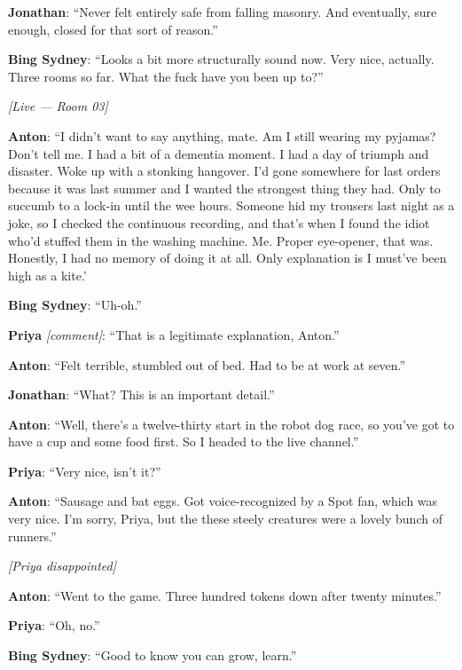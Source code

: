 \noindent\textbf{Jonathan}: ``Never felt entirely safe from falling masonry. And eventually, sure enough, closed for that sort of reason.''

\noindent\textbf{Bing Sydney}: ``Looks a bit more structurally sound now. Very nice, actually. Three rooms so far. What the fuck have you been up to?''

\medskip
\begin{center}
{\small\sffamily\color{nullmesh-ghost}\textit{[Live --- Room 03]}}
\end{center}
\medskip

\noindent\textbf{Anton}: ``I didn't want to say anything, mate. Am I still wearing my pyjamas? Don't tell me. I had a bit of a dementia moment. I had a day of triumph and disaster. Woke up with a stonking hangover. I'd gone somewhere for last orders because it was last summer and I wanted the strongest thing they had. Only to succumb to a lock-in until the wee hours. Someone hid my trousers last night as a joke, so I checked the continuous recording, and that's when I found the idiot who'd stuffed them in the washing machine. Me. Proper eye-opener, that was. Honestly, I had no memory of doing it at all. Only explanation is I must've been high as a kite.'

\noindent\textbf{Bing Sydney}: ``Uh-oh.''

\noindent\textbf{Priya} \textit{[comment]}: ``That is a legitimate explanation, Anton.''

\noindent\textbf{Anton}: ``Felt terrible, stumbled out of bed. Had to be at work at seven.''

\noindent\textbf{Jonathan}: ``What? This is an important detail.''

\noindent\textbf{Anton}: ``Well, there's a twelve-thirty start in the robot dog race, so you've got to have a cup and some food first. So I headed to the live channel.''

\noindent\textbf{Priya}: ``Very nice, isn't it?''

\noindent\textbf{Anton}: ``Sausage and bat eggs. Got voice-recognized by a Spot fan, which was very nice. I'm sorry, Priya, but the these steely creatures were a lovely bunch of runners.''

\noindent\textit{[Priya disappointed]}

\noindent\textbf{Anton}: ``Went to the game. Three hundred tokens down after twenty minutes.''

\noindent\textbf{Priya}: ``Oh, no.''

\noindent\textbf{Bing Sydney}: ``Good to know you can grow, learn.''

